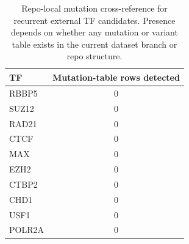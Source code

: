 \begin{table}[htbp]
\centering
\caption{Repo-local mutation cross-reference for recurrent external TF candidates. Presence depends on whether any mutation or variant table exists in the current dataset branch or repo structure.}
\label{tab:external_recurrent_tf_mutation_check}
\begin{tabular}{lc}
\hline
TF & Mutation-table rows detected \\
\hline
RBBP5 & 0 \\
SUZ12 & 0 \\
RAD21 & 0 \\
CTCF & 0 \\
MAX & 0 \\
EZH2 & 0 \\
CTBP2 & 0 \\
CHD1 & 0 \\
USF1 & 0 \\
POLR2A & 0 \\
\hline
\end{tabular}
\end{table}
